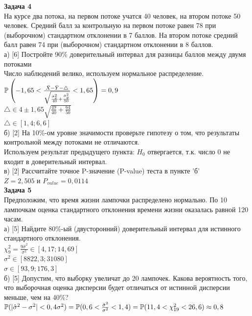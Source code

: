 \documentclass[12pt, a4paper]{article}\usepackage[]{graphicx}\usepackage[]{color}
\begin{document}
{\bf Задача 4} \\
На курсе два потока, на первом потоке учатся 40 человек, на втором
потоке 50 человек. Средний балл за контрольную на первом потоке
равен 78 при (выборочном) стандартном отклонении в 7 баллов. На
втором потоке средний балл равен 74 при (выборочном) стандартном
отклонении в 8 баллов. \\
а) [6] Постройте 90\% доверительный интервал для разницы баллов
между
двумя потоками \\
Число наблюдений велико, используем нормальное распределение. \\
$\P\left(-1,65<\frac{\bar{X}-\bar{Y}-\triangle}{\sqrt{\frac{\hat{\sigma}_{x}^{2}}{40}+\frac{\hat{\sigma}_{y}^{2}}{50}}}<1,65\right)=0,9$ \\
$\triangle \in 4 \pm 1,65\sqrt{\frac{49}{40}+\frac{64}{50}}$ \\
$\triangle \in [1,4;6,6]$ \\
 б) [2] На 10\%-ом уровне значимости проверьте
гипотезу о том, что
результаты контрольной между потоками не отличаются. \\
Используем результат предыдущего пункта: $H_{0}$ отвергается, т.к.
число 0 не входит в доверительный интервал. \\
в) [2] Рассчитайте точное P-значение (P-value) теста в пункте 'б' \\
$Z=2,505$ и $P_{value}=0,0114$ \\

{\bf Задача 5} \\
Предположим, что время жизни лампочки распределено нормально. По
10 лампочкам оценка стандартного отклонения времени жизни
оказалась равной 120 часам. \\
а) [5] Найдите 80\%-ый (двусторонний)
доверительный интервал для истинного стандартного отклонения. \\
$\chi_{9}^{2}=\frac{9\hat{\sigma}^{2}}{\sigma^{2}} \in [4,17;14,69]$ \\
$\sigma^{2} \in [8822,3;31080]$ \\
$\sigma \in [93,9;176,3] $ \\
б) [5] Допустим, что выборку увеличат до 20 лампочек. Какова
вероятность того, что выборочная оценка дисперсии будет отличаться
от истинной дисперсии меньше, чем на 40\%? \\
$\P(|\hat{\sigma}^{2}-\sigma^{2}|<0,4\sigma^{2})=
\P(0,6<\frac{\hat{\sigma}^{2}}{\sigma^{2}}<1,4)=
\P(11,4<\chi_{19}^{2}<26,6)\approx 0,8$ \\
\end{document}
